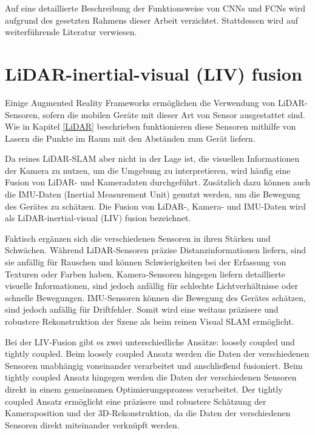 Auf eine detaillierte Beschreibung der Funktionsweise von CNNs und FCNs wird aufgrund des gesetzten Rahmens dieser Arbeit verzichtet. Stattdessen wird auf weiterführende Literatur verwiesen. \cite{long2014fcnn}

\section{LiDAR-inertial-visual (LIV) fusion} \label{sec:LIV}

Einige Augmented Reality Frameworks ermöglichen die Verwendung von LiDAR-Sensoren, sofern die mobilen Geräte mit dieser Art von Sensor ausgestattet sind. Wie in Kapitel \ref{LiDAR} beschrieben funktionieren diese Sensoren mithilfe von Lasern die Punkte im Raum mit den Abständen zum Gerät liefern. \cite{appledevdoc, arcoredevdoc}

Da reines LiDAR-SLAM aber nicht in der Lage ist, die visuellen Informationen der Kamera zu nutzen, um die Umgebung zu interpretieren, wird häufig eine Fusion von LiDAR- und Kameradaten durchgeführt. Zusätzlich dazu können auch die IMU-Daten (Inertial Measurement Unit) genutzt werden, um die Bewegung des Gerätes zu schätzen. Die Fusion von LiDAR-, Kamera- und IMU-Daten wird als LiDAR-inertial-visual (LIV) fusion bezeichnet. \cite{zhang2024lidarslam}

Faktisch ergänzen sich die verschiedenen Sensoren in ihren Stärken und Schwächen. Während LiDAR-Sensoren präzise Distanzinformationen liefern, sind sie anfällig für Rauschen und können Schwierigkeiten bei der Erfassung von Texturen oder Farben haben. Kamera-Sensoren hingegen liefern detaillierte visuelle Informationen, sind jedoch anfällig für schlechte Lichtverhältnisse oder schnelle Bewegungen. IMU-Sensoren können die Bewegung des Gerätes schätzen, sind jedoch anfällig für Driftfehler. Somit wird eine weitaus präzisere und robustere Rekonstruktion der Szene als beim reinen Visual SLAM ermöglicht. \cite{zhang2024lidarslam}

Bei der LIV-Fusion gibt es zwei unterschiedliche Ansätze: loosely coupled und tightly coupled. Beim loosely coupled Ansatz werden die Daten der verschiedenen Sensoren unabhängig voneinander verarbeitet und anschließend fusioniert. Beim tightly coupled Ansatz hingegen werden die Daten der verschiedenen Sensoren direkt in einem gemeinsamen Optimierungsprozess verarbeitet. Der tightly coupled Ansatz ermöglicht eine präzisere und robustere Schätzung der Kameraposition und der 3D-Rekonstruktion, da die Daten der verschiedenen Sensoren direkt miteinander verknüpft werden. \cite{zhang2024lidarslam}

